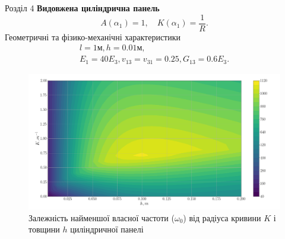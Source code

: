 \documentclass[8pt]{beamer}
\numberwithin{figure}{section}
\numberwithin{equation}{section}
\numberwithin{table}{section}
\begin{document}
\begin{frame}{Розділ 4}
\textbf{Видовжена циліндрична панель}
\begin{equation}
A\left( \alpha_1 \right)=1, \quad K\left( \alpha_1 \right)=\frac{1}{R}.
\end{equation}
Геометричні та фізико-механічні характеристики
\begin{equation}
\begin{gathered}
l=1\text{м}, h=0.01\text{м},\\
E_1=40E_3, v_{13}=v_{31}=0.25, G_{13}=0.6E_3.
\end{gathered}
\end{equation}

\begin{figure}
	\includegraphics[scale=0.17]{pic/thickness_curvature_contour_plot2.png}
		\caption{Залежність найменшої власної частоти ($\omega_0$) від радіуса кривини $K$ і товщини $h$ циліндричної панелі}
		\label{fig:omaga_K_h}
\end{figure}


\end{frame}
\end{document}
